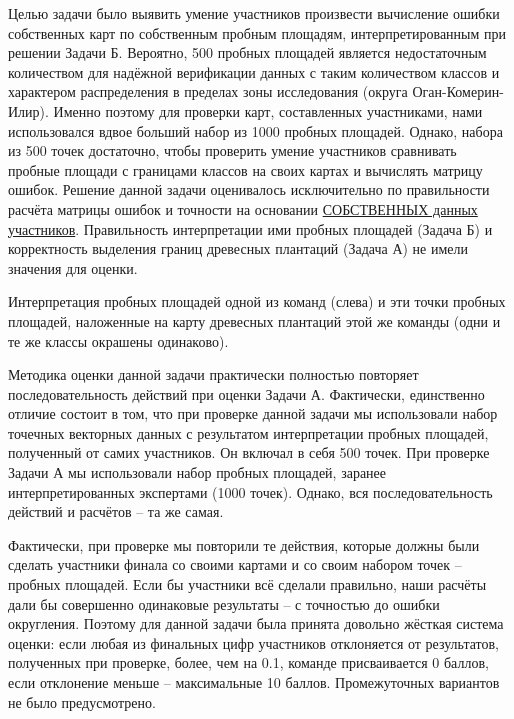 \solutionSection

Целью задачи было выявить умение участников произвести вычисление ошибки собственных карт по собственным пробным площадям, интерпретированным при решении Задачи Б. Вероятно, 500 пробных площадей является недостаточным количеством для надёжной верификации данных с таким количеством классов и характером распределения в пределах зоны исследования (округа Оган-Комерин-Илир). Именно поэтому для проверки карт, составленных участниками, нами использовался вдвое больший набор из 1000 пробных площадей. Однако, набора из 500 точек достаточно, чтобы проверить умение участников сравнивать пробные площади с границами классов на своих картах и вычислять матрицу ошибок.
Решение данной задачи оценивалось исключительно по правильности расчёта матрицы ошибок и точности на основании \underline{СОБСТВЕННЫХ данных участников}. Правильность интерпретации ими пробных площадей (Задача Б) и корректность выделения границ древесных плантаций (Задача А) не имели значения для оценки.


\begin{center}
    Интерпретация пробных площадей одной из команд (слева) и эти точки пробных площадей, наложенные на карту древесных плантаций этой же команды (одни и те же классы окрашены одинаково).
\end{center}

Методика оценки данной задачи практически полностью повторяет последовательность действий при оценки Задачи А. Фактически, единственно отличие состоит в том, что при проверке данной задачи мы использовали набор точечных векторных данных с результатом интерпретации пробных площадей, полученный от самих участников. Он включал в себя 500 точек. При проверке Задачи А мы использовали набор пробных площадей, заранее интерпретированных экспертами (1000 точек). Однако, вся последовательность действий и расчётов – та же самая.

Фактически, при проверке мы повторили те действия, которые должны были сделать участники финала со своими картами и со своим набором точек – пробных площадей. Если бы участники всё сделали правильно, наши расчёты дали бы совершенно одинаковые результаты – с точностью до ошибки округления. Поэтому для данной задачи была принята довольно жёсткая система оценки: если любая из финальных цифр участников отклоняется от результатов, полученных при проверке, более, чем на 0.1, команде присваивается 0 баллов, если отклонение меньше – максимальные 10 баллов. Промежуточных вариантов не было предусмотрено.

